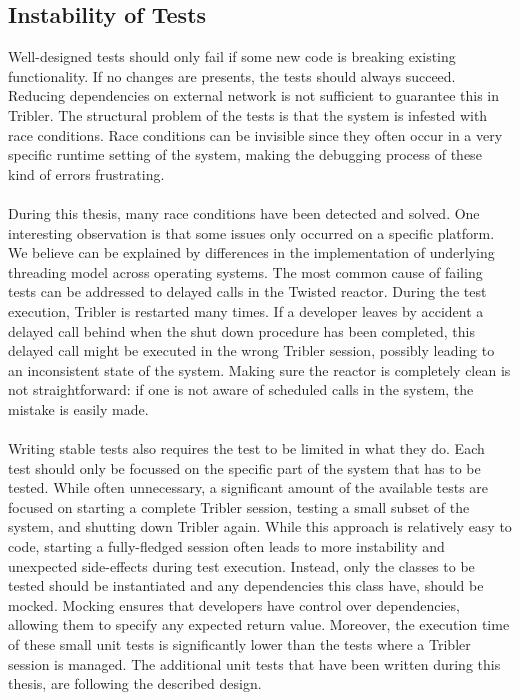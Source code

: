 \subsection{Instability of Tests}
\label{subsec:instability-tests}
Well-designed tests should only fail if some new code is breaking existing functionality. If no changes are presents, the tests should always succeed. Reducing dependencies on external network is not sufficient to guarantee this in Tribler. The structural problem of the tests is that the system is infested with race conditions. Race conditions can be invisible since they often occur in a very specific runtime setting of the system, making the debugging process of these kind of errors frustrating.\\\\
During this thesis, many race conditions have been detected and solved. One interesting observation is that some issues only occurred on a specific platform. We believe can be explained by differences in the implementation of underlying threading model across operating systems. The most common cause of failing tests can be addressed to delayed calls in the Twisted reactor. During the test execution, Tribler is restarted many times. If a developer leaves by accident a delayed call behind when the shut down procedure has been completed, this delayed call might be executed in the wrong Tribler session, possibly leading to an inconsistent state of the system. Making sure the reactor is completely clean is not straightforward: if one is not aware of scheduled calls in the system, the mistake is easily made.\\\\
Writing stable tests also requires the test to be limited in what they do. Each test should only be focussed on the specific part of the system that has to be tested. While often unnecessary, a significant amount of the available tests are focused on starting a complete Tribler session, testing a small subset of the system, and shutting down Tribler again. While this approach is relatively easy to code, starting a fully-fledged session often leads to more instability and unexpected side-effects during test execution. Instead, only the classes to be tested should be instantiated and any dependencies this class have, should be mocked. Mocking ensures that developers have control over dependencies, allowing them to specify any expected return value. Moreover, the execution time of these small unit tests is significantly lower than the tests where a Tribler session is managed. The additional unit tests that have been written during this thesis, are following the described design.

